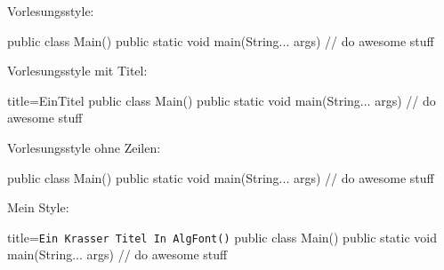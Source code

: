 \documentclass[11pt,letterpaper]{article}
\begin{document}
Vorlesungsstyle:
\begin{VLCode}[autogobble]{}
  public class Main() {
    public static void main(String... args){
      // do awesome stuff
    }
  }
\end{VLCode}
Vorlesungsstyle mit Titel:
\begin{VLCode}[autogobble]{title=EinTitel}
  public class Main() {
    public static void main(String... args){
      // do awesome stuff
    }
  }
\end{VLCode}

Vorlesungsstyle ohne Zeilen:
\begin{VLCode}[autogobble, linenos=false]{}
  public class Main() {
    public static void main(String... args){
      // do awesome stuff
    }
  }
\end{VLCode}

Mein Style:
\begin{ccode}[autogobble]{title={\texttt{Ein Krasser Titel In AlgFont()}}}
  public class Main() {
    public static void main(String... args){
      // do awesome stuff
    }
  }
\end{ccode}
\end{document}
